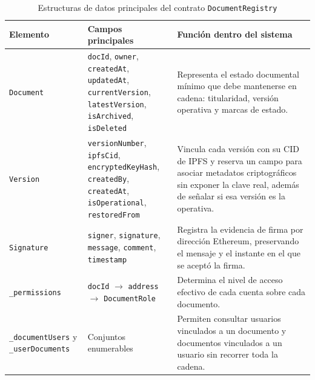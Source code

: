 \documentclass[11pt, a4paper]{article}
\begin{document}
\begin{table}[H]
    \centering
    \small
    \begin{tabular}{|p{3.3cm}|p{4.2cm}|p{6.9cm}|}
    \hline
    \textbf{Elemento} & \textbf{Campos principales} & \textbf{Función dentro del sistema} \\
    \hline
    \texttt{Document} & \parbox[t]{4.1cm}{\texttt{docId}, \texttt{owner},\\ \texttt{createdAt}, \texttt{updatedAt},\\ \texttt{currentVersion}, \texttt{latestVersion},\\ \texttt{isArchived}, \texttt{isDeleted}} & Representa el estado documental mínimo que debe mantenerse en cadena: titularidad, versión operativa y marcas de estado. \\
    \hline
    \texttt{Version} & \parbox[t]{4.1cm}{\texttt{versionNumber}, \texttt{ipfsCid},\\ \texttt{encryptedKeyHash}, \texttt{createdBy},\\ \texttt{createdAt}, \texttt{isOperational},\\ \texttt{restoredFrom}} & Vincula cada versión con su CID de IPFS y reserva un campo para asociar metadatos criptográficos sin exponer la clave real, además de señalar si esa versión es la operativa. \\
    \hline
    \texttt{Signature} & \parbox[t]{4.1cm}{\texttt{signer}, \texttt{signature},\\ \texttt{message}, \texttt{comment},\\ \texttt{timestamp}} & Registra la evidencia de firma por dirección Ethereum, preservando el mensaje y el instante en el que se aceptó la firma. \\
    \hline
    \texttt{\_permissions} & \parbox[t]{4.1cm}{\texttt{docId} $\rightarrow$ \texttt{address}\\ $\rightarrow$ \texttt{DocumentRole}} & Determina el nivel de acceso efectivo de cada cuenta sobre cada documento. \\
    \hline
    \texttt{\_documentUsers} y \texttt{\_userDocuments} & Conjuntos enumerables & Permiten consultar usuarios vinculados a un documento y documentos vinculados a un usuario sin recorrer toda la cadena. \\
    \hline
    \end{tabular}
    \caption{Estructuras de datos principales del contrato \texttt{DocumentRegistry}}
    \label{tab:estructuras-solidity}
\end{table}
\end{document}
